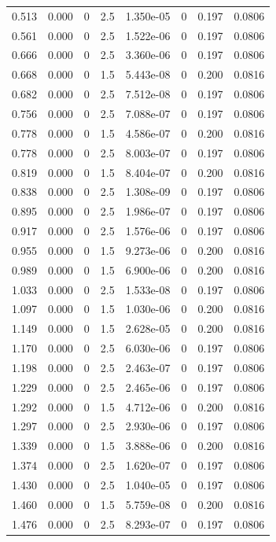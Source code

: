 \documentclass[preview]{standalone}
\begin{document}
{{\begin{tabular}{L{1.2cm}C{1.2cm} C{0.3cm}C{0.5cm} C{1.4cm}C{1.4cm} C{1.4cm}C{1.4cm}}
  0.513  &  0.000  & 0     & 2.5 &  1.350e-05  & 0  & 0.197 &  0.0806   \\ 
  0.561  &  0.000  & 0     & 2.5 &  1.522e-06  & 0  & 0.197 &  0.0806   \\ 
  0.666  &  0.000  & 0     & 2.5 &  3.360e-06  & 0  & 0.197 &  0.0806   \\ 
  0.668  &  0.000  & 0     & 1.5 &  5.443e-08  & 0  & 0.200 &  0.0816   \\ 
  0.682  &  0.000  & 0     & 2.5 &  7.512e-08  & 0  & 0.197 &  0.0806   \\ 
  0.756  &  0.000  & 0     & 2.5 &  7.088e-07  & 0  & 0.197 &  0.0806   \\ 
  0.778  &  0.000  & 0     & 1.5 &  4.586e-07  & 0  & 0.200 &  0.0816   \\ 
  0.778  &  0.000  & 0     & 2.5 &  8.003e-07  & 0  & 0.197 &  0.0806   \\ 
  0.819  &  0.000  & 0     & 1.5 &  8.404e-07  & 0  & 0.200 &  0.0816   \\ 
  0.838  &  0.000  & 0     & 2.5 &  1.308e-09  & 0  & 0.197 &  0.0806   \\ 
  0.895  &  0.000  & 0     & 2.5 &  1.986e-07  & 0  & 0.197 &  0.0806   \\ 
  0.917  &  0.000  & 0     & 2.5 &  1.576e-06  & 0  & 0.197 &  0.0806   \\ 
  0.955  &  0.000  & 0     & 1.5 &  9.273e-06  & 0  & 0.200 &  0.0816   \\ 
  0.989  &  0.000  & 0     & 1.5 &  6.900e-06  & 0  & 0.200 &  0.0816   \\ 
  1.033  &  0.000  & 0     & 2.5 &  1.533e-08  & 0  & 0.197 &  0.0806   \\ 
  1.097  &  0.000  & 0     & 1.5 &  1.030e-06  & 0  & 0.200 &  0.0816   \\ 
  1.149  &  0.000  & 0     & 1.5 &  2.628e-05  & 0  & 0.200 &  0.0816   \\ 
  1.170  &  0.000  & 0     & 2.5 &  6.030e-06  & 0  & 0.197 &  0.0806   \\ 
  1.198  &  0.000  & 0     & 2.5 &  2.463e-07  & 0  & 0.197 &  0.0806   \\ 
  1.229  &  0.000  & 0     & 2.5 &  2.465e-06  & 0  & 0.197 &  0.0806   \\ 
  1.292  &  0.000  & 0     & 1.5 &  4.712e-06  & 0  & 0.200 &  0.0816   \\ 
  1.297  &  0.000  & 0     & 2.5 &  2.930e-06  & 0  & 0.197 &  0.0806   \\ 
  1.339  &  0.000  & 0     & 1.5 &  3.888e-06  & 0  & 0.200 &  0.0816   \\ 
  1.374  &  0.000  & 0     & 2.5 &  1.620e-07  & 0  & 0.197 &  0.0806   \\ 
  1.430  &  0.000  & 0     & 2.5 &  1.040e-05  & 0  & 0.197 &  0.0806   \\ 
  1.460  &  0.000  & 0     & 1.5 &  5.759e-08  & 0  & 0.200 &  0.0816   \\ 
  1.476  &  0.000  & 0     & 2.5 &  8.293e-07  & 0  & 0.197 &  0.0806   \\ 
\hline 
\end{tabular} 

}}
\end{document}
